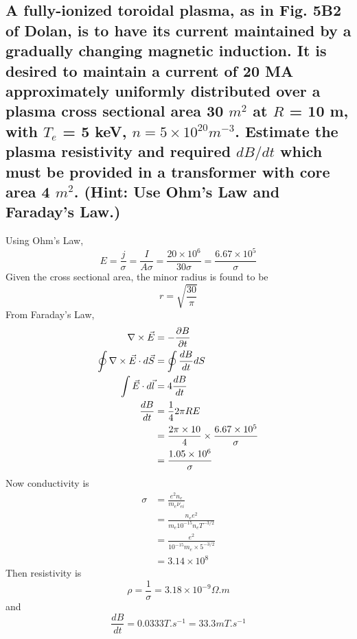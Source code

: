 \documentclass[answers]{exam}
\begin{document}
\begin{questions}
\question{}

\begin{parts}

    \part{A fully-ionized toroidal plasma, as in Fig. 5B2 of Dolan, is to have its current maintained by a gradually changing magnetic induction. It is desired to maintain a current of 20 MA approximately uniformly distributed over a plasma cross sectional area 30 $\unit{m^2}$ at $R$ = 10 m, with $T_e$ = 5 keV, $n = 5 \times 10^{20} \unit{m^{-3}}$. Estimate the plasma resistivity and required $dB/dt$ which must be provided in a transformer with core area 4 $\unit{m^2}$. (Hint: Use Ohm’s Law and Faraday’s Law.)}

\begin{solution}
    Using Ohm's Law,
    $$E = \frac{j}{\sigma} = \frac{I}{A\sigma} = \frac{20 \times 10^6}{30\sigma} = \frac{6.67 \times 10^5}{\sigma}$$
    Given the cross sectional area, the minor radius is found to be
    $$r = \sqrt{\frac{30}{\pi}}$$
    From Faraday's Law,
    \begin{align*}
        \nabla \times \vec E &= -\frac{\partial B}{\partial t} \\
        \oint \nabla \times \vec E \cdot d\vec S &= \oint \frac{dB}{dt} dS \\
        \int \vec E \cdot d\vec l &= 4 \frac{dB}{dt} \\
        \frac{dB}{dt} &= \frac{1}{4} 2\pi RE \\
                      &= \frac{2\pi\times10}{4} \times \frac{6.67 \times 10^5}{\sigma} \\
                      &= \frac{1.05 \times 10^6}{\sigma}
    \end{align*}
    Now conductivity is
    \begin{align*}
        \sigma &= \frac{e^2n_e}{m_e\nu_{ei}} \\
               &= \frac{n_ee^2}{m_e10^{-15}n_eT^{-3/2}} \\
               &= \frac{e^2}{10^{-15}m_e\times5^{-3/2}} \\
               &= 3.14 \times 10^8
    \end{align*}
    Then resistivity is
    $$\rho = \frac{1}{\sigma} = 3.18 \times 10^{-9} \unit{\Omega.m}$$
    and
    $$\frac{dB}{dt} = 0.0333 \unit{T.s^{-1}} = 33.3 \unit{mT.s^{-1}}$$
\end{solution}


\end{parts}
\end{questions}
\end{document}
